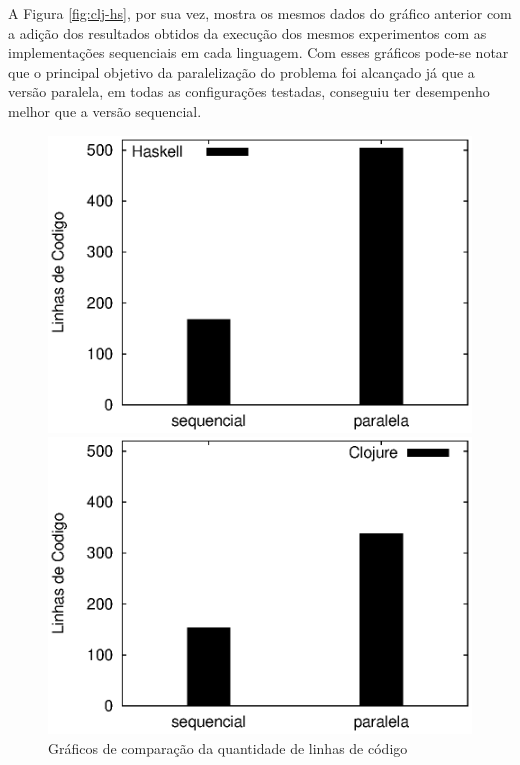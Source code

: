 A Figura \ref{fig:clj-hs}, por sua vez, mostra os mesmos dados do gráfico anterior com a adição dos resultados obtidos da execução dos mesmos experimentos com as implementações sequenciais em cada linguagem. Com esses gráficos pode-se notar que o principal objetivo da paralelização do problema foi alcançado já que a versão paralela, em todas as configurações testadas, conseguiu ter desempenho melhor que a versão sequencial.

\begin{figure}[!h]
 \begin{minipage}{0.5\textwidth}
  \centering
  \includegraphics[scale=0.63]{imagens/loc-haskell.eps}
 \end{minipage}
 \begin{minipage}{0.5\textwidth}
  \includegraphics[scale=0.63]{imagens/loc-clojure.eps}
 \end{minipage}
 \caption{Gráficos de comparação da quantidade de linhas de código}
 \label{fig:clj-hs-loc}
\end{figure}

